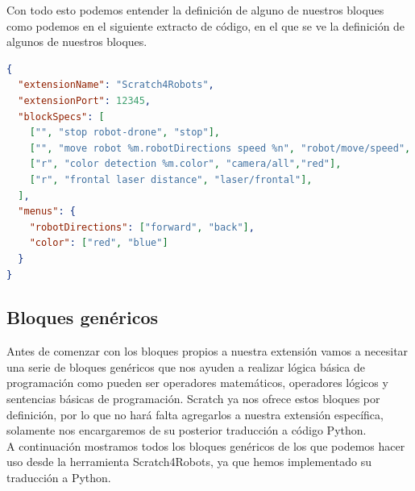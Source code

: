 Con todo esto podemos entender la definición de alguno de nuestros bloques como podemos en el siguiente extracto de código, en el que se ve la definición de algunos de nuestros bloques.
\begin{nobreak} 
\begin{lstlisting}[language=json,firstnumber=1]
{
  "extensionName": "Scratch4Robots",
  "extensionPort": 12345, 
  "blockSpecs": [
    ["", "stop robot-drone", "stop"],         
    ["", "move robot %m.robotDirections speed %n", "robot/move/speed", "forward", 1],
    ["r", "color detection %m.color", "camera/all","red"],
    ["r", "frontal laser distance", "laser/frontal"],
  ],
  "menus": {
    "robotDirections": ["forward", "back"],         
    "color": ["red", "blue"]
  }
}

\end{lstlisting}
\end{nobreak} 

\subsection{Bloques genéricos}
Antes de comenzar con los bloques propios a nuestra extensión vamos a necesitar una serie de bloques genéricos que nos ayuden a realizar lógica básica de programación como pueden ser operadores matemáticos, operadores lógicos y sentencias básicas de programación. Scratch ya nos ofrece estos bloques por definición, por lo que no hará falta agregarlos a nuestra extensión específica, solamente nos encargaremos de su posterior traducción a código Python.\\

A continuación mostramos todos los bloques genéricos de los que podemos hacer uso desde la herramienta Scratch4Robots, ya que hemos implementado su traducción a Python.

